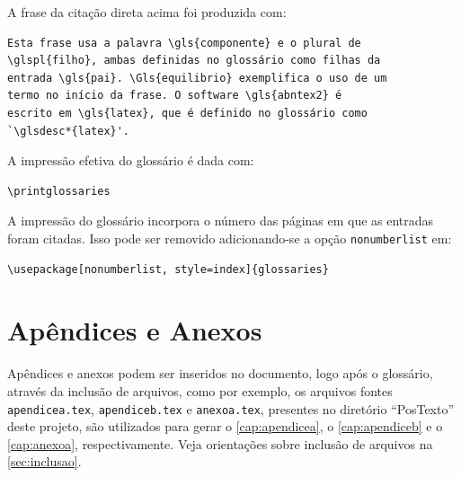 A frase da citação direta acima foi produzida com:

\begin{SingleSpacing}%
\begin{verbatim}
Esta frase usa a palavra \gls{componente} e o plural de
\glspl{filho}, ambas definidas no glossário como filhas da
entrada \gls{pai}. \Gls{equilibrio} exemplifica o uso de um
termo no início da frase. O software \gls{abntex2} é
escrito em \gls{latex}, que é definido no glossário como
`\glsdesc*{latex}'.
\end{verbatim}
\end{SingleSpacing}

A impressão efetiva do glossário é dada com:

\begin{SingleSpacing}%
\begin{verbatim}
\printglossaries
\end{verbatim}
\end{SingleSpacing}

A impressão do glossário incorpora o número das páginas em que as entradas foram citadas. Isso pode ser removido adicionando-se a opção \texttt{nonumberlist} em:

\begin{SingleSpacing}%
\begin{verbatim}
\usepackage[nonumberlist, style=index]{glossaries}
\end{verbatim}
\end{SingleSpacing}

\section{Apêndices e Anexos}\label{sec:apendiceseanexos}

Apêndices e anexos podem ser inseridos no documento, logo após o glossário, através da inclusão de arquivos, como por exemplo, os arquivos fontes \texttt{apendicea.tex}, \texttt{apendiceb.tex} e  \texttt{anexoa.tex}, presentes no diretório ``PosTexto'' deste projeto, são utilizados para gerar o \autoref{cap:apendicea}, o \autoref{cap:apendiceb} e o \autoref{cap:anexoa}, respectivamente. Veja orientações sobre inclusão de arquivos na \autoref{sec:inclusao}.

